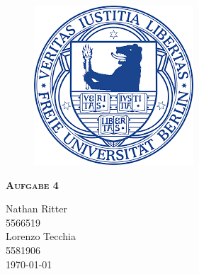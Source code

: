 \documentclass{report}
\begin{document}
\begin{center}
    
\end{center}
    \begin{figure}[htb]
            \centering\includegraphics[width=.5\textwidth]{Immagini/FUlogo.png}
    \end{figure}
    

 {\centering\scshape\LARGE\bfseries Aufgabe 4
    \begin{center}
        Nathan Ritter  \\ 5566519 \\
        Lorenzo Tecchia \\ 5581906  \\ \today
    \end{center}}


    \newpage
    
    \tableofcontents
    \listoffigures
    \listoftables
    
    
    
    

    
    
    \printbibliography
    
\end{document}
